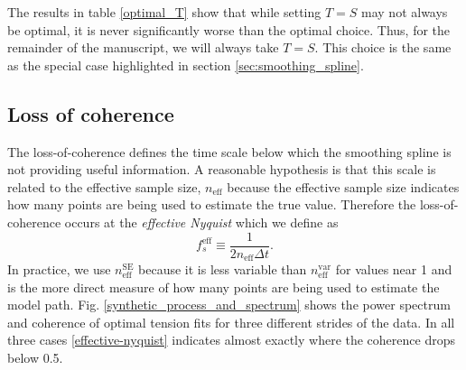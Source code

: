 \documentclass{ametsoc}
\begin{document}
The results in table \ref{optimal_T} show that while setting $T=S$ may not always be optimal, it is never significantly worse than the optimal choice. Thus, for the remainder of the manuscript, we will always take $T=S$. This choice is the same as the special case highlighted in section \ref{sec:smoothing_spline}.

\subsection{Loss of coherence} \label{loss_of_coherence}

The loss-of-coherence defines the time scale below which the smoothing spline is not providing useful information. A reasonable hypothesis is that this scale is related to the effective sample size, $n_{\textrm{eff}}$ because the effective sample size indicates how many points are being used to estimate the true value. Therefore the loss-of-coherence occurs at the \emph{effective Nyquist} which we define as
\begin{equation}
\label{effective-nyquist}
    f_s^{\textrm{eff}} \equiv \frac{1}{2 n_{\textrm{eff}} \Delta t}.
\end{equation}
In practice, we use $n^\textrm{SE}_\textrm{eff}$ because it is less variable than $n^\textrm{var}_\textrm{eff}$ for values near 1 and is the more direct measure of how many points are being used to estimate the model path. 
Fig. \ref{synthetic_process_and_spectrum} shows the power spectrum and coherence of optimal tension fits for three different strides of the data. In all three cases \eqref{effective-nyquist} indicates almost exactly where the coherence drops below 0.5.
\end{document}
